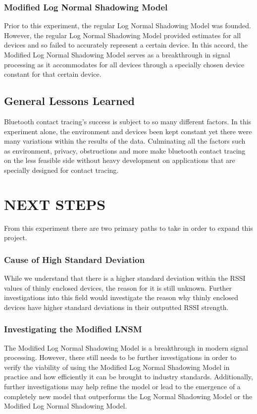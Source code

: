 \documentclass[letterpaper, 10 pt, conference]{ieeeconf}  %
\begin{document}
\subsubsection{Modified Log Normal Shadowing Model}
Prior to this experiment, the regular Log Normal Shadowing Model was founded. However, the regular Log Normal Shadowing Model provided estimates for all devices and so failed to accurately represent a certain device. In this accord, the Modified Log Normal Shadowing Model serves as a breakthrough in signal processing as it accommodates for all devices through a specially chosen device constant for that certain device.
\subsection{General Lessons Learned}
Bluetooth contact tracing's success is subject to so many different factors. In this experiment alone, the environment and devices been kept constant yet there were many variations within the results of the data. Culminating all the factors such as environment, privacy, obstructions and more make bluetooth contact tracing on the less feasible side without heavy development on applications that are specially designed for contact tracing. 
\section{NEXT STEPS}
From this experiment there are two primary paths to take in order to expand this project.
\smallbreak
\subsubsection{Cause of High Standard Deviation}
While we understand that there is a higher standard deviation within the RSSI values of thinly enclosed devices, the reason for it is still unknown. Further investigations into this field would investigate the reason why thinly enclosed devices have higher standard deviations in their outputted RSSI strength. 
\smallbreak
\subsubsection{Investigating the Modified LNSM}
The Modified Log Normal Shadowing Model is a breakthrough in modern signal processing. However, there still needs to be further investigations in order to verify the viability of using the Modified Log Normal Shadowing Model in practice and how efficiently it can be brought to industry standards. Additionally, further investigations may help refine the model or lead to the emergence of a completely new model that outperforms the Log Normal Shadowing Model or the Modified Log Normal Shadowing Model.
\addtolength{\textheight}{-12cm}   %
\end{document}
